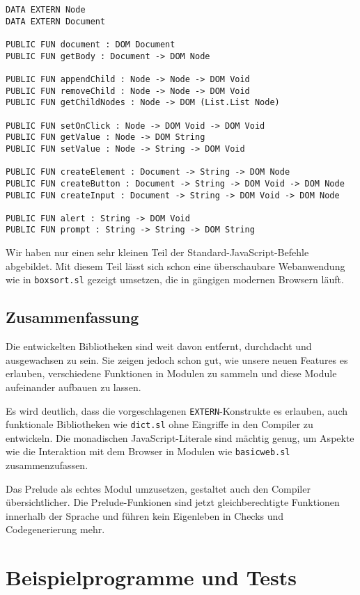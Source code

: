 \documentclass[runningheads]{llncs}
\begin{document}
\begin{verbatim}
DATA EXTERN Node
DATA EXTERN Document

PUBLIC FUN document : DOM Document
PUBLIC FUN getBody : Document -> DOM Node

PUBLIC FUN appendChild : Node -> Node -> DOM Void
PUBLIC FUN removeChild : Node -> Node -> DOM Void
PUBLIC FUN getChildNodes : Node -> DOM (List.List Node)

PUBLIC FUN setOnClick : Node -> DOM Void -> DOM Void
PUBLIC FUN getValue : Node -> DOM String
PUBLIC FUN setValue : Node -> String -> DOM Void

PUBLIC FUN createElement : Document -> String -> DOM Node
PUBLIC FUN createButton : Document -> String -> DOM Void -> DOM Node
PUBLIC FUN createInput : Document -> String -> DOM Void -> DOM Node

PUBLIC FUN alert : String -> DOM Void
PUBLIC FUN prompt : String -> String -> DOM String 
\end{verbatim}

Wir haben nur einen sehr kleinen Teil der Standard-JavaScript-Befehle
abgebildet. Mit diesem Teil lässt sich schon eine überschaubare Webanwendung
wie in \verb|boxsort.sl| gezeigt umsetzen, die in gängigen modernen Browsern
läuft.

\subsection{Zusammenfassung}

Die entwickelten Bibliotheken sind weit davon entfernt, durchdacht und
ausgewachsen zu sein. Sie zeigen jedoch schon gut, wie unsere neuen Features
es erlauben, verschiedene Funktionen in Modulen zu sammeln und diese Module
aufeinander aufbauen zu lassen.

Es wird deutlich, dass die vorgeschlagenen \verb|EXTERN|-Konstrukte es
erlauben, auch funktionale Bibliotheken wie \verb|dict.sl| ohne Eingriffe
in den Compiler zu entwickeln. Die monadischen JavaScript-Literale sind
mächtig genug, um Aspekte wie die Interaktion mit dem Browser in Modulen
wie \verb|basicweb.sl| zusammenzufassen.

Das Prelude als echtes Modul umzusetzen, gestaltet auch den Compiler
übersichtlicher. Die Prelude-Funkionen sind jetzt gleichberechtigte
Funktionen innerhalb der Sprache und führen kein Eigenleben in Checks und
Codegenerierung mehr.

\section{Beispielprogramme und Tests}
\label{sec:samples}
\end{document}
